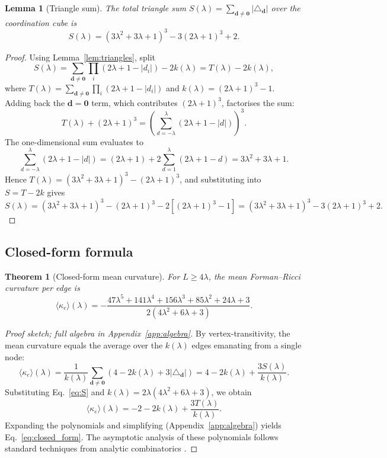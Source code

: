 \documentclass[aps,pre,onecolumn,10pt,groupedaddress,amsmath,amssymb,floatfix]{revtex4-2}
\newtheorem{theorem}{Theorem}
\newtheorem{lemma}{Lemma}
\begin{document}
\begin{lemma}[Triangle sum]
\label{lem:sum_triangles}
The total triangle sum $S(\lambda) = \sum_{\mathbf{d} \neq \mathbf{0}} |\triangle_{\mathbf{d}}|$ over the coordination cube is
\begin{equation}
S(\lambda) = (3\lambda^2 + 3\lambda + 1)^3 - 3(2\lambda+1)^3 + 2.
\label{eq:S}
\end{equation}
\end{lemma}
\begin{proof}
Using Lemma~\ref{lem:triangles}, split
\[
S(\lambda) = \sum_{\mathbf{d} \neq \mathbf{0}} \prod_i (2\lambda+1-|d_i|) - 2k(\lambda) = T(\lambda) - 2k(\lambda),
\]
where $T(\lambda) = \sum_{\mathbf{d} \neq \mathbf{0}} \prod_i (2\lambda+1-|d_i|)$ and $k(\lambda) = (2\lambda+1)^3-1$.
Adding back the $\mathbf{d}=\mathbf{0}$ term, which contributes $(2\lambda+1)^3$, factorises the sum:
\[
T(\lambda) + (2\lambda+1)^3 = \left(\sum_{d=-\lambda}^{\lambda}(2\lambda+1-|d|)\right)^3.
\]
The one-dimensional sum evaluates to
\[
\sum_{d=-\lambda}^{\lambda}(2\lambda+1-|d|) = (2\lambda+1) + 2\sum_{d=1}^{\lambda}(2\lambda+1-d) = 3\lambda^2 + 3\lambda + 1.
\]
Hence $T(\lambda) = (3\lambda^2 + 3\lambda + 1)^3 - (2\lambda+1)^3$, and substituting into $S = T - 2k$ gives
\[
S(\lambda) = (3\lambda^2+3\lambda+1)^3 - (2\lambda+1)^3 - 2[(2\lambda+1)^3 - 1] = (3\lambda^2+3\lambda+1)^3 - 3(2\lambda+1)^3 + 2.
\]
\end{proof}

\subsection{Closed-form formula}

\begin{theorem}[Closed-form mean curvature]
\label{thm:closed_form}
For $L \ge 4\lambda$, the mean Forman--Ricci curvature per edge is
\begin{equation}
\langle\kappa_e\rangle(\lambda) = -\frac{47\lambda^5 + 141\lambda^4 + 156\lambda^3 + 85\lambda^2 + 24\lambda + 3}{2(4\lambda^2 + 6\lambda + 3)}.
\label{eq:closed_form}
\end{equation}
\end{theorem}
\begin{proof}[Proof sketch; full algebra in Appendix~\ref{app:algebra}]
By vertex-transitivity, the mean curvature equals the average over the $k(\lambda)$ edges emanating from a single node:
\[
\langle\kappa_e\rangle(\lambda) = \frac{1}{k(\lambda)}\sum_{\mathbf{d}\neq\mathbf{0}}\left(4 - 2k(\lambda) + 3|\triangle_{\mathbf{d}}|\right) = 4 - 2k(\lambda) + \frac{3S(\lambda)}{k(\lambda)}.
\]
Substituting Eq.~\eqref{eq:S} and $k(\lambda) = 2\lambda(4\lambda^2+6\lambda+3)$, we obtain
\[
\langle\kappa_e\rangle(\lambda) = -2 - 2k(\lambda) + \frac{3T(\lambda)}{k(\lambda)}.
\]
Expanding the polynomials and simplifying (Appendix~\ref{app:algebra}) yields Eq.~\eqref{eq:closed_form}. The asymptotic analysis of these polynomials follows standard techniques from analytic combinatorics \cite{flajolet2009analytic}.
\end{proof}
\end{document}

